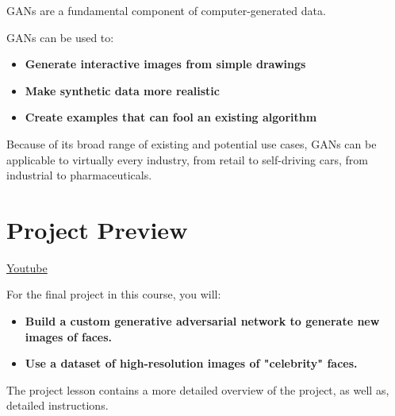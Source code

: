 GANs are a fundamental component of computer-generated data. \newline

GANs can be used to:

\begin{itemize}
    \item \textbf{Generate interactive images from simple drawings}
    \item \textbf{Make synthetic data more realistic}
    \item \textbf{Create examples that can fool an existing algorithm}
\end{itemize}
Because of its broad range of existing and potential use cases, GANs can be applicable to virtually every industry, from retail to self-driving cars, from industrial to pharmaceuticals.


\section{Project Preview}
\href{https://www.youtube.com/watch?v=X8mFTCCYKB8&t=17s}{Youtube} \newline

For the final project in this course, you will:

\begin{itemize}
    \item \textbf{Build a custom generative adversarial network to generate new images of faces.}
    \item \textbf{Use a dataset of high-resolution images of "celebrity" faces.}
\end{itemize}
The project lesson contains a more detailed overview of the project, as well as, detailed instructions.
